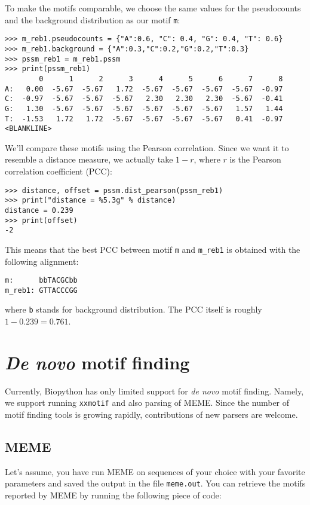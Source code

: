 To make the motifs comparable, we choose the same values for the pseudocounts and the background distribution as our motif \verb|m|:
\begin{verbatim}
>>> m_reb1.pseudocounts = {"A":0.6, "C": 0.4, "G": 0.4, "T": 0.6}
>>> m_reb1.background = {"A":0.3,"C":0.2,"G":0.2,"T":0.3}
>>> pssm_reb1 = m_reb1.pssm
>>> print(pssm_reb1)
        0      1      2      3      4      5      6      7      8
A:   0.00  -5.67  -5.67   1.72  -5.67  -5.67  -5.67  -5.67  -0.97
C:  -0.97  -5.67  -5.67  -5.67   2.30   2.30   2.30  -5.67  -0.41
G:   1.30  -5.67  -5.67  -5.67  -5.67  -5.67  -5.67   1.57   1.44
T:  -1.53   1.72   1.72  -5.67  -5.67  -5.67  -5.67   0.41  -0.97
<BLANKLINE>
\end{verbatim}
We'll compare these motifs using the Pearson correlation.
Since we want it to resemble a distance measure, we actually take
$1-r$, where $r$ is the Pearson correlation coefficient (PCC):
\begin{verbatim}
>>> distance, offset = pssm.dist_pearson(pssm_reb1)
>>> print("distance = %5.3g" % distance)
distance = 0.239
>>> print(offset)
-2
\end{verbatim}
This means that the best PCC between motif \verb|m| and  \verb|m_reb1| is obtained with the following alignment:
\begin{verbatim}
m:      bbTACGCbb
m_reb1: GTTACCCGG
\end{verbatim}
where \verb|b| stands for background distribution. The PCC itself is
roughly $1-0.239=0.761$.

\section{\emph{De novo} motif finding}
\label{sec:find}

Currently, Biopython has only limited support for \emph{de novo} motif
finding. Namely, we support running \verb|xxmotif| and also parsing of
MEME. Since the number of motif finding tools is growing rapidly,
contributions of new parsers are welcome.

\subsection{MEME}
\label{sec:meme}

Let's assume, you have run MEME on sequences of your choice with your
favorite parameters and saved the output in the file
\verb|meme.out|. You can retrieve the motifs reported by MEME by
running the following piece of code:

